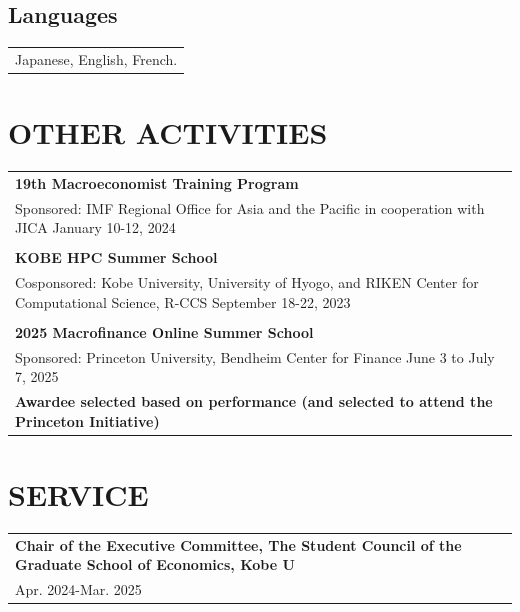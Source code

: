 \documentclass[11pt]{article}
\begin{document}
\subsection*{Languages}
\begin{tabularx}{\linewidth}{X}
Japanese, English, French.
\end{tabularx}

\section*{OTHER ACTIVITIES}
\begin{tabularx}{\linewidth}{X}
\textbf{19th Macroeconomist Training Program}\\
Sponsored: IMF Regional Office for Asia and the Pacific in cooperation with JICA \hfill January 10-12, 2024\\
\\
\textbf{KOBE HPC Summer School}\\
Cosponsored: Kobe University, University of Hyogo, and RIKEN Center for Computational Science, R-CCS \hfill September 18-22, 2023\\
\\
\textbf{2025 Macrofinance Online Summer School}\\
Sponsored: Princeton University, Bendheim Center for Finance \hfill June 3 to July 7, 2025\\
\textbf{Awardee selected based on performance (and selected to attend the Princeton Initiative)}
\end{tabularx}
\section*{SERVICE}
\begin{tabularx}{\linewidth}{X}
\textbf{Chair of the Executive Committee, The Student Council of the Graduate School of Economics, Kobe U} \\
\hfill Apr. 2024-Mar. 2025
\end{tabularx}
\end{document}
